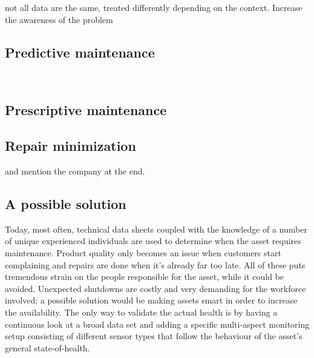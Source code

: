 not all data are the same, treated differently depending on the context. 
Increase the awareness of the problem

\subsection{Predictive maintenance}
~\cite{Misc:zensor_blog}
\subsection{Prescriptive maintenance}
\subsection{Repair minimization}

and mention the company at the end.
\subsection{A possible solution}
Today, most often, technical data sheets coupled with the knowledge of a number of unique experienced individuals are used to determine when the asset requires maintenance. 
Product quality only becomes an issue when customers start complaining and repairs are done when it's already far too late.
All of these puts tremendous strain on the people responsible for the asset, while it could be avoided.
Unexpected shutdowns are costly and very demanding for the workforce involved; a possible solution would be making assets smart in order to increase the availability.
The only way to validate the actual health is by having a continuous look at a broad data set and adding a specific multi-aspect monitoring setup 
consisting of different sensor types that follow the behaviour of the asset's general state-of-health.